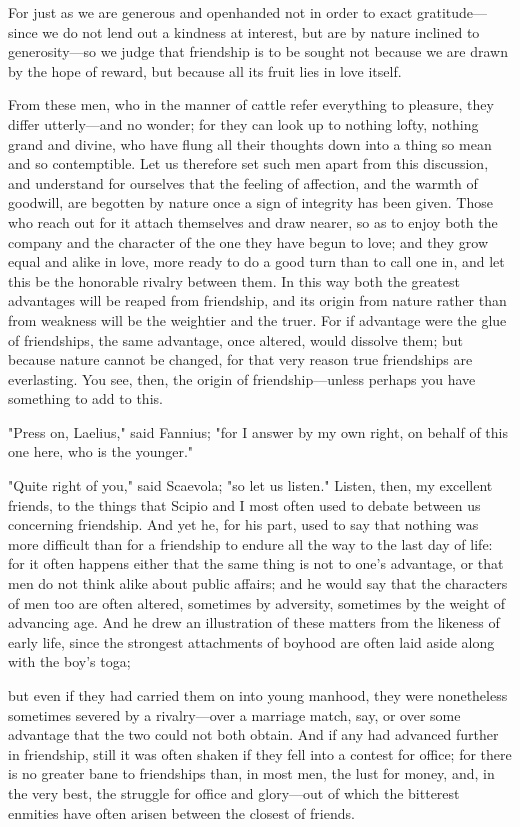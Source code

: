  For just as we are generous and openhanded not in order to exact gratitude—since we do not lend out a kindness at interest, but are by nature inclined to generosity—so we judge that friendship is to be sought not because we are drawn by the hope of reward, but because all its fruit lies in love itself.

 From these men, who in the manner of cattle refer everything to pleasure, they differ utterly—and no wonder; for they can look up to nothing lofty, nothing grand and divine, who have flung all their thoughts down into a thing so mean and so contemptible. Let us therefore set such men apart from this discussion, and understand for ourselves that the feeling of affection, and the warmth of goodwill, are begotten by nature once a sign of integrity has been given. Those who reach out for it attach themselves and draw nearer, so as to enjoy both the company and the character of the one they have begun to love; and they grow equal and alike in love, more ready to do a good turn than to call one in, and let this be the honorable rivalry between them. In this way both the greatest advantages will be reaped from friendship, and its origin from nature rather than from weakness will be the weightier and the truer. For if advantage were the glue of friendships, the same advantage, once altered, would dissolve them; but because nature cannot be changed, for that very reason true friendships are everlasting. You see, then, the origin of friendship—unless perhaps you have something to add to this.

"Press on, Laelius," said Fannius; "for I answer by my own right, on behalf of this one here, who is the younger."

 "Quite right of you," said Scaevola; "so let us listen." Listen, then, my excellent friends, to the things that Scipio and I most often used to debate between us concerning friendship. And yet he, for his part, used to say that nothing was more difficult than for a friendship to endure all the way to the last day of life: for it often happens either that the same thing is not to one's advantage, or that men do not think alike about public affairs; and he would say that the characters of men too are often altered, sometimes by adversity, sometimes by the weight of advancing age. And he drew an illustration of these matters from the likeness of early life, since the strongest attachments of boyhood are often laid aside along with the boy's toga;

 but even if they had carried them on into young manhood, they were nonetheless sometimes severed by a rivalry—over a marriage match, say, or over some advantage that the two could not both obtain. And if any had advanced further in friendship, still it was often shaken if they fell into a contest for office; for there is no greater bane to friendships than, in most men, the lust for money, and, in the very best, the struggle for office and glory—out of which the bitterest enmities have often arisen between the closest of friends.

